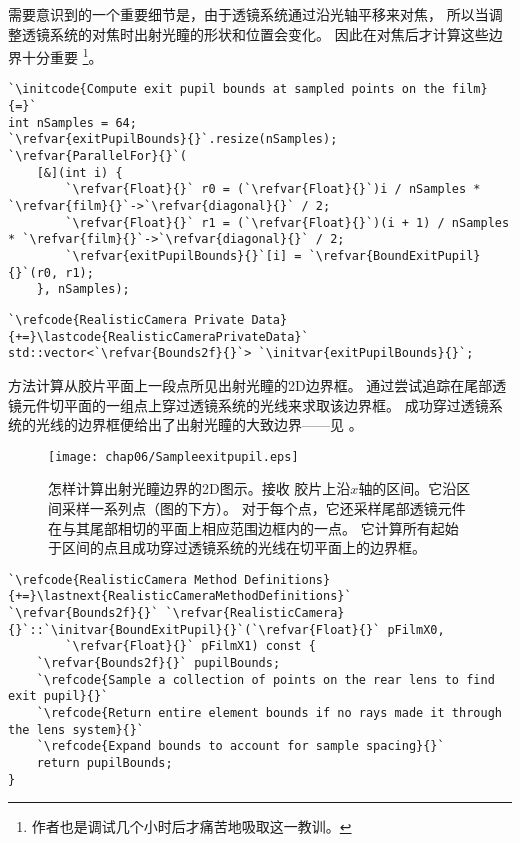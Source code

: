 需要意识到的一个重要细节是，由于透镜系统通过沿光轴平移来对焦，
所以当调整透镜系统的对焦时出射光瞳的形状和位置会变化。
因此在对焦后才计算这些边界十分重要
\footnote{作者也是调试几个小时后才痛苦地吸取这一教训。}。
\begin{lstlisting}
`\initcode{Compute exit pupil bounds at sampled points on the film}{=}`
int nSamples = 64;
`\refvar{exitPupilBounds}{}`.resize(nSamples);
`\refvar{ParallelFor}{}`(
    [&](int i) {
        `\refvar{Float}{}` r0 = (`\refvar{Float}{}`)i / nSamples * `\refvar{film}{}`->`\refvar{diagonal}{}` / 2;
        `\refvar{Float}{}` r1 = (`\refvar{Float}{}`)(i + 1) / nSamples * `\refvar{film}{}`->`\refvar{diagonal}{}` / 2;
        `\refvar{exitPupilBounds}{}`[i] = `\refvar{BoundExitPupil}{}`(r0, r1);
    }, nSamples);
\end{lstlisting}
\begin{lstlisting}
`\refcode{RealisticCamera Private Data}{+=}\lastcode{RealisticCameraPrivateData}`
std::vector<`\refvar{Bounds2f}{}`> `\initvar{exitPupilBounds}{}`;
\end{lstlisting}

方法计算从胶片平面上一段点所见出射光瞳的2D边界框。
通过尝试追踪在尾部透镜元件切平面的一组点上穿过透镜系统的光线来求取该边界框。
成功穿过透镜系统的光线的边界框便给出了出射光瞳的大致边界——见
。
\begin{figure}[htbp]
    \centering\texttt{[image: chap06/Sampleexitpupil.eps]}
    \caption{怎样计算出射光瞳边界的2D图示。接收
        胶片上沿$x$轴的区间。它沿区间采样一系列点（图的下方）。
        对于每个点，它还采样尾部透镜元件在与其尾部相切的平面上相应范围边框内的一点。
        它计算所有起始于区间的点且成功穿过透镜系统的光线在切平面上的边界框。}
    \label{fig:6.23}
\end{figure}
\begin{lstlisting}
`\refcode{RealisticCamera Method Definitions}{+=}\lastnext{RealisticCameraMethodDefinitions}`
`\refvar{Bounds2f}{}` `\refvar{RealisticCamera}{}`::`\initvar{BoundExitPupil}{}`(`\refvar{Float}{}` pFilmX0,
        `\refvar{Float}{}` pFilmX1) const {
    `\refvar{Bounds2f}{}` pupilBounds;
    `\refcode{Sample a collection of points on the rear lens to find exit pupil}{}`
    `\refcode{Return entire element bounds if no rays made it through the lens system}{}`
    `\refcode{Expand bounds to account for sample spacing}{}`
    return pupilBounds;
}
\end{lstlisting}


